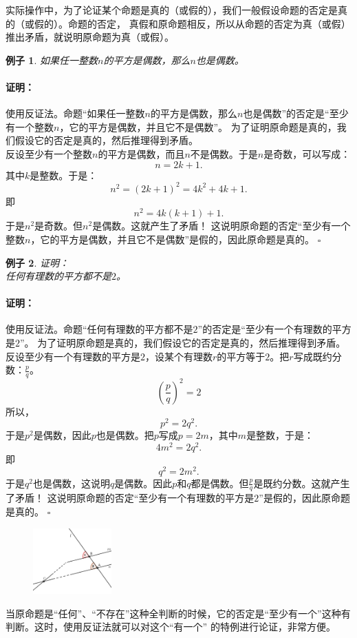 \documentclass[12pt,UTF8]{ctexbook}
\newtheorem{ex}{例子}[section]
\newenvironment{proof2}{\paragraph{\textbf{证明：}}}{\hfill$\square$}
\begin{document}
实际操作中，为了论证某个命题是真的（或假的），我们一般假设命题的否定是真的（或假的）。命题的否定，
真假和原命题相反，所以从命题的否定为真（或假）推出矛盾，就说明原命题为真（或假）。

\begin{ex}\label{ex:2-0-0}
    如果任一整数$n$的平方是偶数，那么$n$也是偶数。
\end{ex}
\begin{proof2}
    使用反证法。命题“如果任一整数$n$的平方是偶数，那么$n$也是偶数”的否定是“至少有一个整数$n$，它的平方是偶数，并且它不是偶数”。
    为了证明原命题是真的，我们假设它的否定是真的，然后推理得到矛盾。\\
    反设至少有一个整数$n$的平方是偶数，而且$n$不是偶数。于是$n$是奇数，可以写成：
    $$ n = 2k+1.$$
    其中$k$是整数。于是：
    $$ n^2 = (2k+1)^2 = 4k^2 + 4k + 1.$$
    即
    $$ n^2 = 4k(k+1)+1.$$
    于是$n^2$是奇数。但$n^2$是偶数。这就产生了矛盾！
    这说明原命题的否定“至少有一个整数$n$，它的平方是偶数，并且它不是偶数”是假的，因此原命题是真的。
\end{proof2}

\begin{ex}\label{ex:2-0-1}
    证明：\\
    任何有理数的平方都不是$2$。
\end{ex}
\begin{proof2}
    使用反证法。命题“任何有理数的平方都不是$2$”的否定是“至少有一个有理数的平方是$2$”。
    为了证明原命题是真的，我们假设它的否定是真的，然后推理得到矛盾。\\
    反设至少有一个有理数的平方是$2$，设某个有理数$r$的平方等于$2$。把$r$写成既约分数：$\frac{p}{q}$。
    $$ \left(\frac{p}{q}\right)^2 = 2$$
    所以，
    $$ p^2 = 2q^2.$$
    于是$p^2$是偶数，因此$p$也是偶数。把$p$写成$p = 2m$，其中$m$是整数，于是：
    $$ 4m^2 = 2q^2.$$
    即
    $$ q^2 = 2m^2.$$
    于是$q^2$也是偶数，这说明$q$是偶数。因此$p$和$q$都是偶数。但$\frac{p}{q}$是既约分数。这就产生了矛盾！
    这说明原命题的否定“至少有一个有理数的平方是$2$”是假的，因此原命题是真的。
\end{proof2}

\begin{figure} %
    \vspace{10pt}
    \includegraphics[width=0.27\textwidth]{反证法1.png}
\end{figure}
当原命题是“任何”、“不存在”这种全判断的时候，它的否定是“至少有一个”这种有判断。这时，使用反证法就可以对这个“有一个”
的特例进行论证，非常方便。
\end{document}
